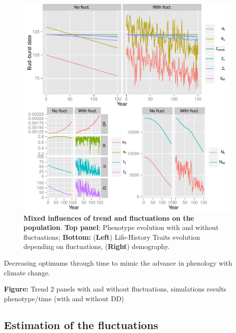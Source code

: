 \begin{figure}[ht!]
	\centering
	\includegraphics[scale=1]{Figures/Trend.pdf}
	\caption{\textbf{Mixed influences of trend and fluctuations on the population}. \textbf{Top panel}: Phenotype evolution with and without fluctuations; \textbf{Bottom:} (\textbf{Left}) Life-History Traits evolution depending on fluctuations, (\textbf{Right}) demography.}
	\label{fig:thetaf}
\end{figure}

Decreasing optimums through time to mimic the advance in phenology with climate change.

\textbf{Figure:} Trend 2 panels with and without fluctuations, simulations results phenotype/time (with and without DD)

\subsection*{Estimation of the fluctuations}

